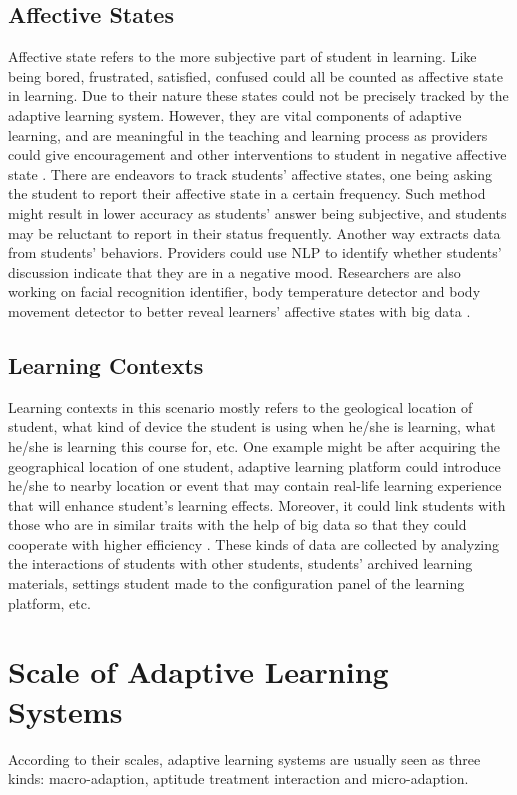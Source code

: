 \documentclass[sigconf]{acmart}
\begin{document}
\subsection{Affective States}
Affective state refers to the more subjective part of student in learning. Like being bored, frustrated, satisfied, confused could all be counted as affective state in learning. Due to their nature these states could not be precisely tracked by the adaptive learning system. However, they are vital components of adaptive learning, and are meaningful in the teaching and learning process as providers could give encouragement and other interventions to student in negative affective state \cite{Vandewaetere2011}. 
There are endeavors to track students’ affective states, one being asking the student to report their affective state in a certain frequency. Such method might result in lower accuracy as students’ answer being subjective, and students may be reluctant to report in their status frequently. Another way extracts data from students’ behaviors. Providers could use NLP to identify whether students’ discussion indicate that they are in a negative mood. Researchers are also working on facial recognition identifier, body temperature detector and body movement detector to better reveal learners’ affective states with big data \cite{Merrill2002}.

\subsection{Learning Contexts}
Learning contexts in this scenario mostly refers to the geological location of student, what kind of device the student is using when he/she is learning, what he/she is learning this course for, etc. One example might be after acquiring the geographical location of one student, adaptive learning platform could introduce he/she to nearby location or event that may contain real-life learning experience that will enhance student’s learning effects. Moreover, it could link students with those who are in similar traits with the help of big data so that they could cooperate with higher efficiency \cite{Park2004}. 
These kinds of data are collected by analyzing the interactions of students with other students, students’ archived learning materials, settings student made to the configuration panel of the learning platform, etc.

\section{Scale of Adaptive Learning Systems}
According to their scales, adaptive learning systems are usually seen as three kinds: macro-adaption, aptitude treatment interaction and micro-adaption.
\end{document}
